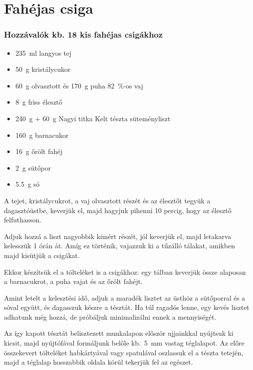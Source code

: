 \newpage
\section{Fahéjas csiga} \label{sec:fahejas-csiga}

\subsubsection*{Hozzávalók kb. 18 kis fahéjas csigákhoz}
\begin{itemize}
    \item \qty{235}{\ml} langyos tej
    \item \qty{50}{\g} kristálycukor
    \item \qty{60}{\g} olvasztott és \qty{170}{\g} puha \qty{82}{\percent}-os vaj
    \item \qty{8}{\g} friss élesztő
    \item \qty{240}{\g} + \qty{60}{\g} Nagyi titka Kelt tészta süteményliszt
    \item \qty{160}{\g} barnacukor
    \item \qty{16}{\g} őrölt fahéj
    \item \qty{2}{\g} sütőpor
    \item \qty{5.5}{\g} só
\end{itemize}

A tejet, kristálycukrot, a vaj olvasztott részét és az élesztőt tegyük a dagasztóüstbe, keverjük el, majd hagyjuk pihenni \num{10} percig, hogy az élesztő felfuthasson.

Adjuk hozzá a liszt nagyobbik kimért részét, jól keverjük el, majd letakarva kelesszük \num{1} órán át. Amíg ez történik, vajazzuk ki a tűzálló tálakat, amikben majd kisütjük a csigákat.

Ekkor készítsük el a tölteléket is a csigákhoz: egy tálban keverjük össze alaposan a barnacukrot, a puha vajat és az őrölt fahéjt.

Amint letelt a kelesztési idő, adjuk a maradék lisztet az üsthöz a sütőporral és a sóval együtt, és dagasszuk készre a tésztát. Ha túl ragadós lenne, egy kevés lisztet adhatunk még hozzá, de próbáljuk minimalizálni ennek a mennyiségét.

Az így kapott tésztát belisztezett munkalapon először ujjainkkal nyújtsuk ki kicsit, majd nyújtófával formáljunk belőle kb.~\qty{5}{\mm} vastag téglalapot. Az előre összekevert tölteléket habkártyával vagy spatulával oszlassuk el a tészta tetején, majd a téglalap hosszabbik oldala körül tekerjük fel az egészet.

